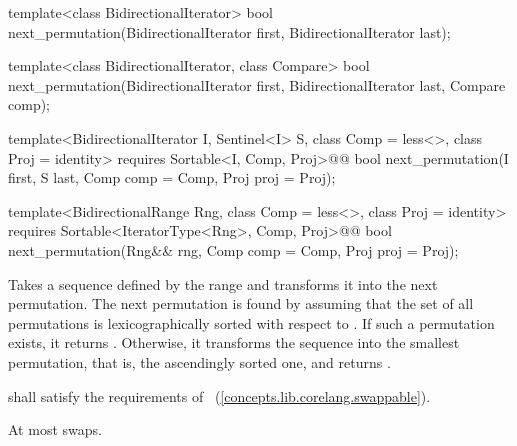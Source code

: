 %
\begin{removedblock}
\begin{itemdecl}
template<class BidirectionalIterator>
  bool next_permutation(BidirectionalIterator first,
                        BidirectionalIterator last);

template<class BidirectionalIterator, class Compare>
  bool next_permutation(BidirectionalIterator first,
                        BidirectionalIterator last, Compare comp);
\end{itemdecl}
\end{removedblock}
\begin{addedblock}
\begin{itemdecl}
template<BidirectionalIterator I, Sentinel<I> S, class Comp = less<>,
    class Proj = identity>
  requires Sortable<I, Comp, Proj>@\newtxt{()}@
  bool next_permutation(I first, S last, Comp comp = Comp{}, Proj proj = Proj{});

template<BidirectionalRange Rng, class Comp = less<>,
    class Proj = identity>
  requires Sortable<IteratorType<Rng>, Comp, Proj>@\newtxt{()}@
  bool
    next_permutation(Rng&& rng, Comp comp = Comp{}, Proj proj = Proj{});
\end{itemdecl}
\end{addedblock}

\begin{itemdescr}
\pnum
\effects
Takes a sequence defined by the range
and transforms it into the next permutation.
The next permutation is found by assuming that the set of all permutations is
lexicographically sorted with respect to
 .
If such a permutation exists, it returns
.
Otherwise, it transforms the sequence into the smallest permutation,
that is, the ascendingly sorted one, and returns
.

\begin{removedblock}
\pnum
\requires
{} shall satisfy the requirements of
~(\ref{concepts.lib.corelang.swappable}).
\end{removedblock}

\pnum
\complexity
At most
swaps.
\end{itemdescr}


